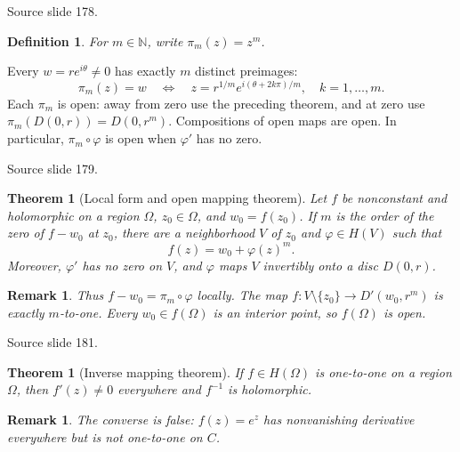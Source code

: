 \documentclass[10pt,letterpaper,twoside,openright]{amsbook}
\numberwithin{equation}{subsection}
\theoremstyle{sea-plain}
\newtheorem{theorem}[subsection]{Theorem}
\theoremstyle{sea-definition}
\newtheorem{definition}[subsection]{Definition}
\newtheorem{remark}[subsection]{Remark}
\theoremstyle{sea-exercise}
\newcommand{\NN}{\mathbb{N}}
\newcommand{\RR}{\mathbb{R}}
\newcommand{\CC}{\mathbb{C}}
\newcommand{\DD}{\mathbb{D}}
\newcommand{\HH}{\mathbb{H}}
\newcommand{\Chat}{\mathbb{C}_{\infty}}
\def\CC{C}\def\RR{R}\def\DD{D}\def\HH{H}\def\Chat{C infinity}}
\newcommand{\src}[1]{\par\smallskip\noindent
 {\scriptsize\sffamily\color{SoftWhite}Source slide #1.}\par\nopagebreak\smallskip}
\begin{document}
\src{178}
\begin{definition}
For $m\in\NN$, write $\pi_m(z)=z^m$.
\end{definition}
Every $w=re^{i\theta}\ne0$ has exactly $m$ distinct preimages:
\[
\pi_m(z)=w\quad\Longleftrightarrow\quad
z=r^{1/m}e^{i(\theta+2k\pi)/m},\quad k=1,\ldots,m.
\]
Each $\pi_m$ is open: away from zero use the preceding theorem,
and at zero use $\pi_m(D(0,r))=D(0,r^m)$.
Compositions of open maps are open. In particular, $\pi_m\circ\varphi$
is open when $\varphi'$ has no zero.
\src{179}
\begin{theorem}[Local form and open mapping theorem]
Let $f$ be nonconstant and holomorphic on a region $\Omega$,
$z_0\in\Omega$, and $w_0=f(z_0)$. If $m$ is the order of the
zero of $f-w_0$ at $z_0$, there are a neighborhood $V$ of $z_0$
and $\varphi\in H(V)$ such that
\[
f(z)=w_0+\varphi(z)^m.
\]
Moreover, $\varphi'$ has no zero on $V$, and $\varphi$ maps
$V$ invertibly onto a disc $D(0,r)$.
\end{theorem}
\begin{remark}
Thus $f-w_0=\pi_m\circ\varphi$ locally.
The map $f:V\setminus\{z_0\}\to D'(w_0,r^m)$ is exactly $m$-to-one.
Every $w_0\in f(\Omega)$ is an interior point, so $f(\Omega)$ is open.
\end{remark}
\src{181}
\begin{theorem}[Inverse mapping theorem]
If $f\in H(\Omega)$ is one-to-one on a region $\Omega$, then
$f'(z)\ne0$ everywhere and $f^{-1}$ is holomorphic.
\end{theorem}
\begin{remark}
The converse is false: $f(z)=e^z$ has nonvanishing derivative
everywhere but is not one-to-one on $\CC$.
\end{remark}
\end{document}
